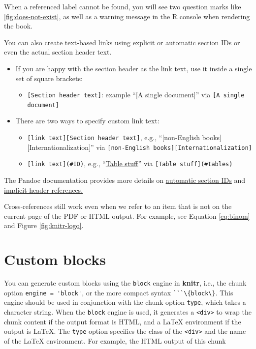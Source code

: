 \documentclass[doctor,openright,twoside]{sjtuthesis}
\providecommand{\tightlist}{%
    \setlength{\itemsep}{0pt}\setlength{\parskip}{0pt}}
\newcommand{\passthrough}[1]{#1}
\theoremstyle{plain}
\theoremstyle{definition}
\theoremstyle{remark}
\theoremstyle{ocrenumbox}
\theoremstyle{plain}
\begin{document}
When a referenced label cannot be found, you will see two question marks
like \ref{fig:does-not-exist}, as well as a warning message in the R
console when rendering the book.

You can also create text-based links using explicit or automatic section
IDs or even the actual section header text.

\begin{itemize}
\tightlist
\item
  If you are happy with the section header as the link text, use it
  inside a single set of square brackets:

  \begin{itemize}
  \tightlist
  \item
    \passthrough{\lstinline![Section header text]!}: example ``{[}A
    single document{]}'' via
    \passthrough{\lstinline![A single document]!}
  \end{itemize}
\item
  There are two ways to specify custom link text:

  \begin{itemize}
  \tightlist
  \item
    \passthrough{\lstinline![link text][Section header text]!}, e.g.,
    ``{[}non-English books{]}{[}Internationalization{]}'' via
    \passthrough{\lstinline![non-English books][Internationalization]!}
  \item
    \passthrough{\lstinline![link text](#ID)!}, e.g.,
    ``\protect\hyperlink{tables}{Table stuff}'' via
    \passthrough{\lstinline![Table stuff](#tables)!}
  \end{itemize}
\end{itemize}

The Pandoc documentation provides more details on
\href{http://pandoc.org/MANUAL.html\#extension-auto_identifiers}{automatic
section IDs} and
\href{http://pandoc.org/MANUAL.html\#extension-implicit_header_references}{implicit
header references.}

Cross-references still work even when we refer to an item that is not on
the current page of the PDF or HTML output. For example, see Equation
\eqref{eq:binom} and Figure \ref{fig:knitr-logo}.

\hypertarget{custom-blocks}{%
\section{Custom blocks}\label{custom-blocks}}

You can generate custom blocks using the
\passthrough{\lstinline!block!} engine in \textbf{knitr}, i.e., the
chunk option \passthrough{\lstinline!engine = 'block'!}, or the more
compact syntax \passthrough{\lstinline!```\{block\}!}. This engine
should be used in conjunction with the chunk option
\passthrough{\lstinline!type!}, which takes a character string. When the
\passthrough{\lstinline!block!} engine is used, it generates a
\passthrough{\lstinline!<div>!} to wrap the chunk content if the output
format is HTML, and a LaTeX environment if the output is LaTeX. The
\passthrough{\lstinline!type!} option specifies the class of the
\passthrough{\lstinline!<div>!} and the name of the LaTeX environment.
For example, the HTML output of this chunk
\end{document}
